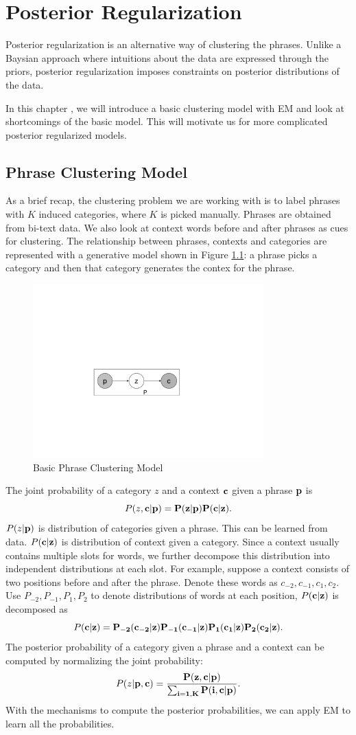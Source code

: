 \chapter{Posterior Regularization}
Posterior regularization is an alternative way of clustering the phrases.
Unlike a Baysian approach where intuitions about the data are expressed through the priors, posterior regularization imposes constraints on posterior distributions of the data.

In this chapter , we will introduce a basic clustering model with EM 
and look at shortcomings of the basic model. This will motivate us for
more complicated posterior regularized models.
\section{Phrase Clustering Model} 
As a brief recap, the clustering problem we are working with
is to label phrases with $K$ induced categories, where
$K$ is picked manually.
Phrases are obtained from bi-text data.
We also look at context
 words before and after
phrases as cues for clustering.
The relationship between phrases, contexts and categories are
represented with a generative model shown in 
Figure \ref{fig:EM}: a phrase picks a 
category and then that category generates the contex for the phrase.

\begin{figure}[h]
  \centering
  \includegraphics[width=3.5in]{EMdigram}
  \caption{Basic Phrase Clustering Model}
  \label{fig:EM}
\end{figure}

The joint probability of a category $z$ and a context $\bf{c}$ 
given a phrase $\bf{p}$ is
\[
P(z,\bf{c}|\bf{p})=P(z|\bf{p})P(\bf{c}|z).
\]
$P(z|\bf{p})$ is distribution of categories given a phrase.
This can be learned from data.
$P(\bf{c}|z)$ is distribution of context given a category.
Since a context usually contains multiple slots for words, we further
decompose this distribution into independent distributions at
each slot. For example, suppose a context consists of two positions 
before and after the phrase. Denote these words as 
$c_{-2},c_{-1},c_1,c_2$.
Use $P_{-2},P_{-1},P_1,P_2$ to denote distributions of words at each 
position, $P(\bf{c}|z)$ is decomposed as
\[
P(\bf{c}|z)=P_{-2}(c_{-2}|z)P_{-1}
(c_{-1}|z)P_1(c_1|z)P_2(c_2|z).
\]
The posterior probability of a category given a phrase
and a context can be computed by normalizing the joint probability:
\[
P(z|\bf{p},\bf{c})=\frac{P(z,\bf{c}|\bf{p})}
{\sum_{i=1,K}P(i,\bf{c}|\bf{p})}.
\]
With the mechanisms to compute the posterior probabilities, we can 
apply EM to learn all the probabilities.
